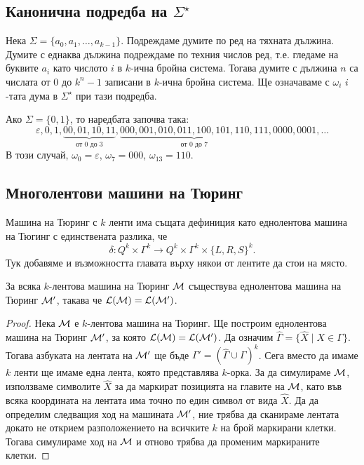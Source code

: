 \subsection*{Канонична подредба на $\Sigma^\star$}

Нека $\Sigma = \{a_0,a_1,\dots,a_{k-1}\}$.
Подреждаме думите по ред на тяхната дължина.
Думите с еднаква дължина подреждаме по техния числов ред, т.е.
гледаме на буквите $a_i$ като числото $i$ в $k$-ична бройна система.
Тогава думите с дължина $n$ са числата от $0$ до $k^n-1$ записани в $k$-ична бройна система.
Ще означаваме с $\omega_i$ $i$-тата дума в $\Sigma^\star$ при тази подредба.

\begin{example}
  Ако $\Sigma = \{0,1\}$, то наредбата започва така:
  \[\varepsilon, 0, 1, \underbrace{00, 01, 10, 11}_{\text{от $0$ до $3$}}, \underbrace{000, 001, 010, 011, 100, 101, 110, 111}_{\text{от $0$ до $7$}}, 0000, 0001, \dots\]
  В този случай, $\omega_0 = \varepsilon$, $\omega_7 = 000$, $\omega_{13} = 110$.
\end{example}

\subsection*{Многолентови машини на Тюринг}


Машина на Тюринг с $k$ ленти има същата дефиниция като еднолентова машина на Тюгинг
с единствената разлика, че
\[\delta: Q^k \times \Gamma^k\to Q^k \times \Gamma^k \times \{L,R,S\}^k.\]
Тук добавяме и възможността главата върху някои от лентите да стои на място.
\begin{prop}
  За всяка $k$-лентова машина на Тюринг $\mathcal{M}$ съществува еднолентова машина на Тюринг $\mathcal{M}'$,
  такава че $\mathcal{L}(\mathcal{M}) = \mathcal{L}(\mathcal{M}')$.
\end{prop}
\begin{proof}
  Нека $\mathcal{M}$ е $k$-лентова машина на Тюринг.
  Ще построим еднолентова машина на Тюринг $\mathcal{M}'$, за която $\mathcal{L}(\mathcal{M}) = \mathcal{L}(\mathcal{M}')$.
  Да означим $\hat\Gamma = \{\hat X \mid X \in \Gamma\}$.
  Тогава азбуката на лентата на $\mathcal{M}'$ ще бъде $\Gamma' = (\hat\Gamma \cup \Gamma)^{k}$.
  Сега вместо да имаме $k$ ленти ще имаме една лента, която представлява $k$-орка.
  За да симулираме $\mathcal{M}$, използваме символите $\hat X$ за да маркират позицията на главите на $\mathcal{M}$,
  като във всяка координата на лентата има точно по един символ от вида $\hat X$.
  Да да определим следващия ход на машината $\mathcal{M}'$, ние трябва да сканираме лентата докато не 
  открием разположението на всичките $k$ на брой маркирани клетки. Тогава симулираме ход на $\mathcal{M}$
  и отново трябва да променим маркираните клетки.
\end{proof}

